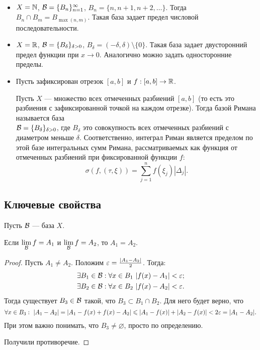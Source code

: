 \documentclass[a4paper, 12pt]{article}
\begin{document}
\begin{Examples}\ 
\begin{itemize}
\item $X = \mathbb{N}$, $\mathcal{B} = \{B_n\}_{n=1}^{\infty}$, $B_n = \{n, n+1, n+2, \ldots  \}$. Тогда $B_n \cap B_m = B_{\max(n, m)}$. Такая база задает предел числовой последовательности.
\item $X = \mathbb{R}$, $\mathcal{B} = \{B_\delta\}_{\delta>0}$, $B_\delta = (-\delta, \delta)\setminus \{0\}$. Такая база задает двусторонний предел функции при $x\to 0$. Аналогично можно задать односторонние пределы.
\item Пусть зафиксирован отрезок $[a, b]$ и $f:[a, b] \to \mathbb{R}$.

Пусть $X$ --- множество всех отмеченных разбиений $[a, b]$ (то есть это разбиения с зафиксированной точкой на каждом отрезке). Тогда базой Римана называется база\\ $\mathcal{B} = \{B_\delta\}_{\delta>0}$, где $B_\delta$ это совокупность всех отмеченных разбиений с диаметром меньше $\delta$. Соответственно, интеграл Риман является пределом по 
этой базе интегральных сумм Римана, рассматриваемых как функция от отмеченных разбиений при фиксированной функции $f$:
$$
\sigma(f, (\tau, \xi)) = \sum\limits_{j=1}^{n}f(\xi_j)|\Delta_j|.
$$
\end{itemize}
\end{Examples}

\subsection{Ключевые свойства}
Пусть $\mathcal{B}$ --- база $X$.

\begin{Statement}
Если $\lim\limits_{\mathcal{B}} f = A_1$ и $\lim\limits_{\mathcal{B}} f = A_2$, то $A_1 = A_2$.
\end{Statement}
\begin{proof}
Пусть $A_1 \neq A_2$. Положим $\varepsilon = \frac{|A_1 - A_2|}{2}$. Тогда:
\begin{align*}
& \exists B_1 \in \mathcal{B}: \forall x \in B_1\ |f(x) - A_1| < \varepsilon; \\
& \exists B_2 \in \mathcal{B}: \forall x \in B_2\ |f(x) - A_2| < \varepsilon.
\end{align*}
Тогда существует $B_3 \in \mathcal{B}$ такой, что $B_3 \subset B_1 \cap B_2$. Для него будет верно, что
$$
\forall x \in B_3:\ |A_1 - A_2| = |A_1 - f(x) + f(x) - A_2| \leqslant |A_1 - f(x)| + |A_2 - f(x)| < 2\varepsilon = |A_1 - A_2|.
$$
При этом важно понимать, что $B_3 \neq \varnothing$, просто по определению.

Получили противоречие.
\end{proof}
\end{document}

